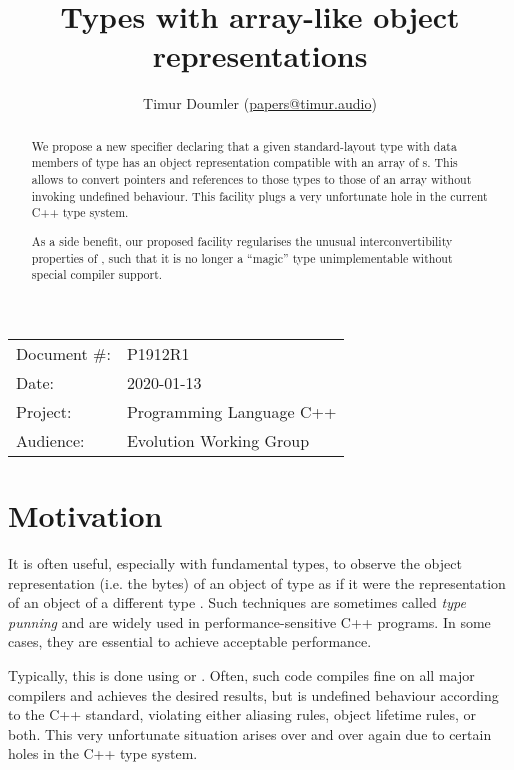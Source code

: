 

\newcommand{\forceindent}{\parindent=1em\indent\parindent=0pt\relax} %


\title{Types with array-like object representations}
\author{
  Timur Doumler \small(\href{mailto:papers@timur.audio}{papers@timur.audio})
}
\date{}
\maketitle

\begin{tabular}{ll}
Document \#: & P1912R1 \\
Date: & 2020-01-13\\
Project: & Programming Language C++ \\
Audience: & Evolution Working Group
\end{tabular}


\begin{abstract}
We propose a new specifier declaring that a given standard-layout type  with data members of type  has an object representation compatible with an array of s. This allows to convert pointers and references to those types to those of an array without invoking undefined behaviour. This facility plugs a very unfortunate hole in the current C++ type system.

As a side benefit, our proposed facility regularises the unusual interconvertibility properties of , such that it is no longer a ``magic'' type unimplementable without special compiler support.
\end{abstract}

\vspace{4mm} 

\section{Motivation}

It is often useful, especially with fundamental types, to observe the object representation (i.e. the bytes) of an object of type  as if it were the representation of an object of a different type . Such techniques are sometimes called \emph{type punning} and are widely used in performance-sensitive C++ programs. In some cases, they are essential to achieve acceptable performance. 

Typically, this is done using  or . Often, such code compiles fine on all major compilers and achieves the desired results, but is undefined behaviour according to the C++ standard, violating either aliasing rules, object lifetime rules, or both. This very unfortunate situation arises over and over again due to certain holes in the C++ type system. 

